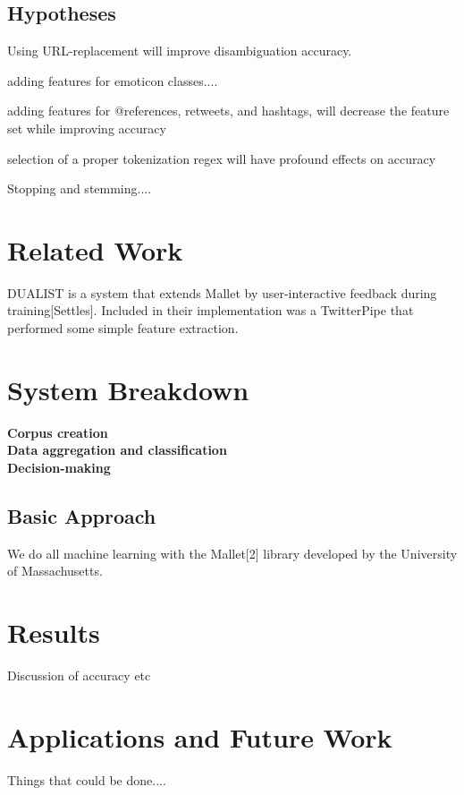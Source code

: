 \documentclass[letterpaper]{article}
\begin{document}
\subsection{Hypotheses}
\item Using URL-replacement will improve disambiguation accuracy. 
\item adding features for emoticon classes....
\item adding features for @references, retweets, and hashtags, will decrease the feature set while improving accuracy
\item selection of a proper tokenization regex will have profound effects on accuracy
\item Stopping and stemming....

\section{Related Work}
DUALIST is a system that extends Mallet by user-interactive feedback during training[Settles]. Included in their implementation was a TwitterPipe that performed some simple feature extraction. 


\section{System Breakdown}
\textbf{Corpus creation}\\
\textbf{Data aggregation and classification}\\
\textbf{Decision-making}\\

\subsection{Basic Approach}

We do all machine learning with the Mallet[2] library developed by the University of Massachusetts. 


\section{Results}

Discussion of accuracy etc

\section{Applications and Future Work}

Things that could be done....
\end{document}
